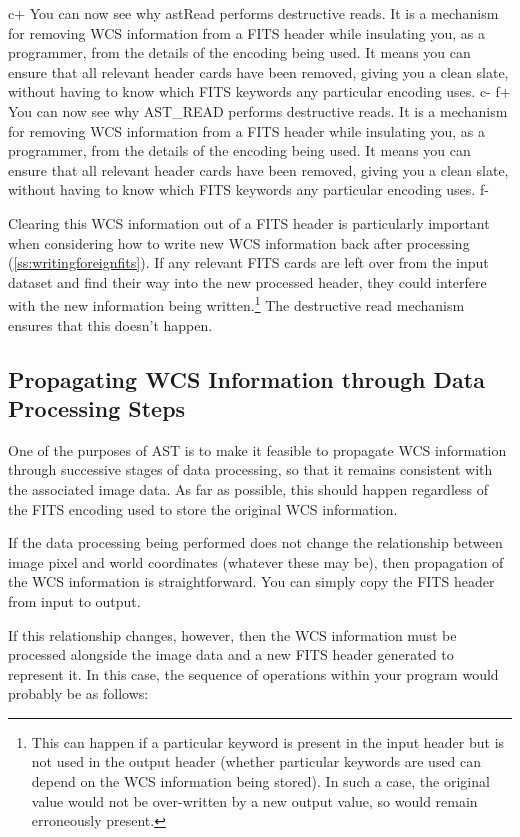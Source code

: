 \documentclass[twoside,11pt]{article}
\newcommand{\secref}[1]{\S\ref{#1}}
\renewcommand{\secref}[1]{\ref{#1}}
\begin{document}
c+
You can now see why astRead performs destructive reads. It is a
mechanism for removing WCS information from a FITS header while
insulating you, as a programmer, from the details of the encoding
being used. It means you can ensure that all relevant header cards
have been removed, giving you a clean slate, without having to know
which FITS keywords any particular encoding uses.
c-
f+
You can now see why AST\_READ performs destructive reads. It is a
mechanism for removing WCS information from a FITS header while
insulating you, as a programmer, from the details of the encoding
being used. It means you can ensure that all relevant header cards
have been removed, giving you a clean slate, without having to know
which FITS keywords any particular encoding uses.
f-

Clearing this WCS information out of a FITS header is particularly
important when considering how to write new WCS information back after
processing (\secref{ss:writingforeignfits}). If any relevant FITS
cards are left over from the input dataset and find their way into the
new processed header, they could interfere with the new information
being written.\footnote{This can happen if a particular keyword is
present in the input header but is not used in the output header
(whether particular keywords are used can depend on the WCS
information being stored). In such a case, the original value would
not be over-written by a new output value, so would remain erroneously
present.} The destructive read mechanism ensures that this doesn't
happen.

\subsection{\label{ss:propagatingwcsinformation}Propagating WCS Information through Data Processing Steps}

One of the purposes of AST is to make it feasible to propagate WCS
information through successive stages of data processing, so that it
remains consistent with the associated image data. As far as possible,
this should happen regardless of the FITS encoding used to store the
original WCS information.

If the data processing being performed does not change the
relationship between image pixel and world coordinates (whatever these
may be), then propagation of the WCS information is
straightforward. You can simply copy the FITS header from input to
output.

If this relationship changes, however, then the WCS information must
be processed alongside the image data and a new FITS header generated
to represent it. In this case, the sequence of operations within your
program would probably be as follows:
\end{document}
